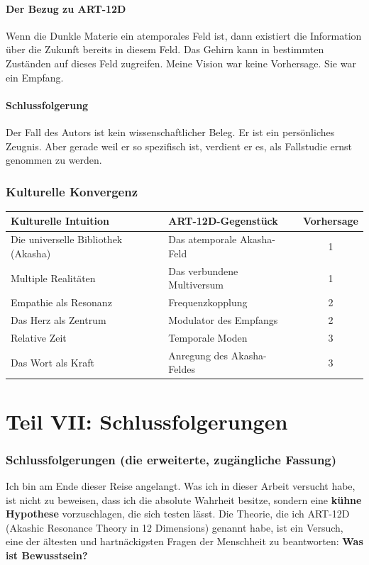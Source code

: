 \documentclass[11pt,a4paper]{article}
\begin{document}
\subsection{Der Bezug zu ART-12D}
Wenn die Dunkle Materie ein atemporales Feld ist, dann existiert die Information über die Zukunft bereits in diesem Feld. Das Gehirn kann in bestimmten Zuständen auf dieses Feld zugreifen. Meine Vision war keine Vorhersage. Sie war ein Empfang.

\subsection{Schlussfolgerung}
Der Fall des Autors ist kein wissenschaftlicher Beleg. Er ist ein persönliches Zeugnis. Aber gerade weil er so spezifisch ist, verdient er es, als Fallstudie ernst genommen zu werden.

\section{Kulturelle Konvergenz}
\begin{table}[H]
\centering
\begin{tabular}{@{}llc@{}}
\toprule
\textbf{Kulturelle Intuition} & \textbf{ART-12D-Gegenstück} & \textbf{Vorhersage} \\ \midrule
Die universelle Bibliothek (Akasha) & Das atemporale Akasha-Feld & 1 \\
Multiple Realitäten & Das verbundene Multiversum & 1 \\
Empathie als Resonanz & Frequenzkopplung & 2 \\
Das Herz als Zentrum & Modulator des Empfangs & 2 \\
Relative Zeit & Temporale Moden & 3 \\
Das Wort als Kraft & Anregung des Akasha-Feldes & 3 \\ \bottomrule
\end{tabular}
\end{table}

\newpage
\part*{Teil VII: Schlussfolgerungen}

\section{Schlussfolgerungen (die erweiterte, zugängliche Fassung)}
Ich bin am Ende dieser Reise angelangt. Was ich in dieser Arbeit versucht habe, ist nicht zu beweisen, dass ich die absolute Wahrheit besitze, sondern eine \textbf{kühne Hypothese} vorzuschlagen, die sich testen lässt. Die Theorie, die ich ART-12D (Akashic Resonance Theory in 12 Dimensions) genannt habe, ist ein Versuch, eine der ältesten und hartnäckigsten Fragen der Menschheit zu beantworten: \textbf{Was ist Bewusstsein?}
\end{document}
